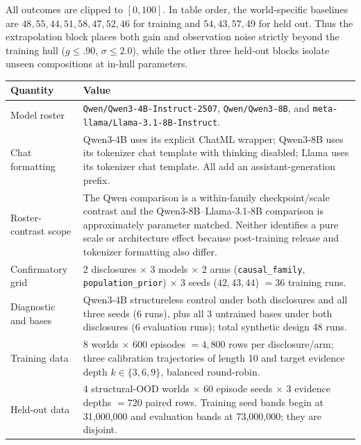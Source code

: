 All outcomes are clipped to $[0,100]$. In table order, the world-specific
baselines are $48,55,44,51,58,47,52,46$ for training and $54,43,57,49$ for
held out. Thus the extrapolation block places both gain and observation noise
strictly beyond the training hull ($g\leq .90$, $\sigma\leq2.0$), while the
other three held-out blocks isolate unseen compositions at in-hull parameters.
\begin{center}
\begin{minipage}{\linewidth}
\centering
{}
\label{tab:exp3-expanded-hparams}
\scriptsize
\setlength{\tabcolsep}{3pt}
\begin{tabular}{p{.29\linewidth}p{.66\linewidth}}
\toprule
\textbf{Quantity} & \textbf{Value} \\
\midrule
Model roster & \texttt{Qwen/Qwen3-4B-Instruct-2507},
\texttt{Qwen/Qwen3-8B}, and \texttt{meta-llama/Llama-3.1-8B-Instruct}. \\
Chat formatting & Qwen3-4B uses its explicit ChatML wrapper; Qwen3-8B uses its
tokenizer chat template with thinking disabled; Llama uses its tokenizer chat
template.  All add an assistant-generation prefix. \\
Roster-contrast scope & The Qwen comparison is a within-family
checkpoint/scale contrast and the Qwen3-8B--Llama-3.1-8B comparison is
approximately parameter matched.  Neither identifies a pure scale or architecture
effect because post-training release and tokenizer formatting also differ. \\
Confirmatory grid & 2 disclosures $\times$ 3 models $\times$ 2 arms
(\texttt{causal\_family}, \texttt{population\_prior}) $\times$ 3 seeds
($42,43,44$) $=36$ training runs. \\
Diagnostic and bases & Qwen3-4B structureless control under both disclosures and
all three seeds (6 runs), plus all 3 untrained bases under both disclosures (6
evaluation runs); total synthetic design 48 runs. \\
Training data & 8 worlds $\times$ 600 episodes $=4,800$ rows per disclosure/arm;
three calibration trajectories of length 10 and target evidence depth
$k\in\{3,6,9\}$, balanced round-robin. \\
Held-out data & 4 structural-OOD worlds $\times$ 60 episode seeds $\times$ 3 evidence
depths $=720$ paired rows.  Training seed bands begin at 31,000,000 and evaluation
bands at 73,000,000; they are disjoint. \\

\end{tabular}
\end{minipage}
\end{center}
